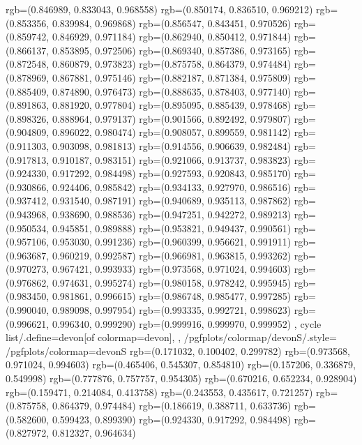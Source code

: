 {{{					rgb=(0.846989, 0.833043, 0.968558)
					rgb=(0.850174, 0.836510, 0.969212)
					rgb=(0.853356, 0.839984, 0.969868)
					rgb=(0.856547, 0.843451, 0.970526)
					rgb=(0.859742, 0.846929, 0.971184)
					rgb=(0.862940, 0.850412, 0.971844)
					rgb=(0.866137, 0.853895, 0.972506)
					rgb=(0.869340, 0.857386, 0.973165)
					rgb=(0.872548, 0.860879, 0.973823)
					rgb=(0.875758, 0.864379, 0.974484)
					rgb=(0.878969, 0.867881, 0.975146)
					rgb=(0.882187, 0.871384, 0.975809)
					rgb=(0.885409, 0.874890, 0.976473)
					rgb=(0.888635, 0.878403, 0.977140)
					rgb=(0.891863, 0.881920, 0.977804)
					rgb=(0.895095, 0.885439, 0.978468)
					rgb=(0.898326, 0.888964, 0.979137)
					rgb=(0.901566, 0.892492, 0.979807)
					rgb=(0.904809, 0.896022, 0.980474)
					rgb=(0.908057, 0.899559, 0.981142)
					rgb=(0.911303, 0.903098, 0.981813)
					rgb=(0.914556, 0.906639, 0.982484)
					rgb=(0.917813, 0.910187, 0.983151)
					rgb=(0.921066, 0.913737, 0.983823)
					rgb=(0.924330, 0.917292, 0.984498)
					rgb=(0.927593, 0.920843, 0.985170)
					rgb=(0.930866, 0.924406, 0.985842)
					rgb=(0.934133, 0.927970, 0.986516)
					rgb=(0.937412, 0.931540, 0.987191)
					rgb=(0.940689, 0.935113, 0.987862)
					rgb=(0.943968, 0.938690, 0.988536)
					rgb=(0.947251, 0.942272, 0.989213)
					rgb=(0.950534, 0.945851, 0.989888)
					rgb=(0.953821, 0.949437, 0.990561)
					rgb=(0.957106, 0.953030, 0.991236)
					rgb=(0.960399, 0.956621, 0.991911)
					rgb=(0.963687, 0.960219, 0.992587)
					rgb=(0.966981, 0.963815, 0.993262)
					rgb=(0.970273, 0.967421, 0.993933)
					rgb=(0.973568, 0.971024, 0.994603)
					rgb=(0.976862, 0.974631, 0.995274)
					rgb=(0.980158, 0.978242, 0.995945)
					rgb=(0.983450, 0.981861, 0.996615)
					rgb=(0.986748, 0.985477, 0.997285)
					rgb=(0.990040, 0.989098, 0.997954)
					rgb=(0.993335, 0.992721, 0.998623)
					rgb=(0.996621, 0.996340, 0.999290)
					rgb=(0.999916, 0.999970, 0.999952)
			},
		cycle list/.define={devon}{[of colormap=devon]},
		},
		/pgfplots/colormap/devonS/.style={
			/pgfplots/colormap={devonS}{%
					rgb=(0.171032, 0.100402, 0.299782)
					rgb=(0.973568, 0.971024, 0.994603)
					rgb=(0.465406, 0.545307, 0.854810)
					rgb=(0.157206, 0.336879, 0.549998)
					rgb=(0.777876, 0.757757, 0.954305)
					rgb=(0.670216, 0.652234, 0.928904)
					rgb=(0.159471, 0.214084, 0.413758)
					rgb=(0.243553, 0.435617, 0.721257)
					rgb=(0.875758, 0.864379, 0.974484)
					rgb=(0.186619, 0.388711, 0.633736)
					rgb=(0.582600, 0.599423, 0.899390)
					rgb=(0.924330, 0.917292, 0.984498)
					rgb=(0.827972, 0.812327, 0.964634)
}}}
